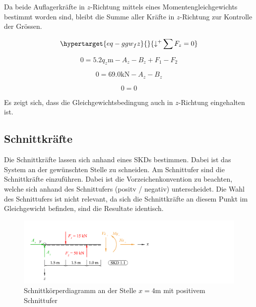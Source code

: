 \documentclass[
  12pt,
  letterpaper,
  DIV=11,
  egregdoesnotlikesansseriftitles]{scrartcl}
\begin{document}
Da beide Auflagerkräfte in \(z\)-Richtung mittels eines
Momentengleichgewichts bestimmt worden sind, bleibt die Summe aller
Kräfte in \(z\)-Richtung zur Kontrolle der Grössen.

\begin{equation}\protect\hypertarget{eq-ggw_fz}{}{
{\downarrow^+}\sum F_z = 0
}\label{eq-ggw_fz}\end{equation}

\begin{equation}0 = 5.2 q_{z} \text{m} - A_{z} - B_{z} + F_{1} - F_{2}\end{equation}

\begin{equation}0 = 69.0 \text{k} \text{N} - A_{z} - B_{z}\end{equation}

\begin{equation}0 = 0\end{equation}

Es zeigt sich, dass die Gleichgewichtsbedingung auch in \(z\)-Richtung
eingehalten ist.

\hypertarget{schnittkruxe4fte}{%
\subsection{Schnittkräfte}\label{schnittkruxe4fte}}

Die Schnittkräfte lassen sich anhand eines SKDs bestimmen. Dabei ist das
System an der gewünschten Stelle zu schneiden. Am Schnittufer sind die
Schnittkräfte einzuführen. Dabei ist die Vorzeichenkonvention zu
beachten, welche sich anhand des Schnittufers (positv / negativ)
unterscheidet. Die Wahl des Schnittufers ist nicht relevant, da sich die
Schnittkräfte an diesem Punkt im Gleichgewicht befinden, sind die
Resultate identisch.

\begin{figure}[H]

{\centering \includegraphics{BSI_HS23_Testat_01_files/mediabag/../images/Testat_01_HS23_SKD_1.pdf}

}

\caption{\label{fig-skd_4_pos}Schnittkörperdiagramm an der Stelle
\(x=4\)m mit positivem Schnittufer}

\end{figure}
\end{document}
